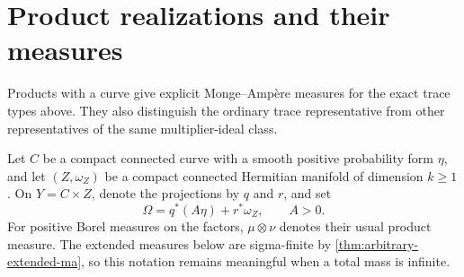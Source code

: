 \section{Product realizations and their measures}
\label{sec:trace-product-measures}

Products with a curve give explicit Monge--Amp\`ere measures for the exact trace types above. They also distinguish the ordinary trace representative from other representatives of the same multiplier-ideal class.

Let $C$ be a compact connected curve with a smooth positive probability form $\eta$, and let $(Z,\omega_Z)$ be a compact connected Hermitian manifold of dimension $k\geq1$. On $Y=C\times Z$, denote the projections by $q$ and $r$, and set
\[
 \Omega=q^*(A\eta)+r^*\omega_Z,\qquad A>0.
\]
For positive Borel measures on the factors, $\mu\otimes\nu$ denotes their usual product measure. The extended measures below are sigma-finite by \cref{thm:arbitrary-extended-ma}, so this notation remains meaningful when a total mass is infinite.

